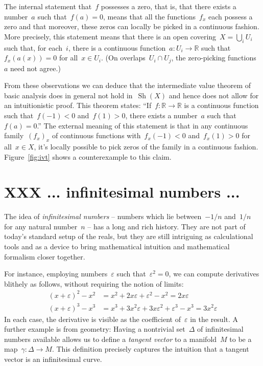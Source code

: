 \documentclass[oneside]{amsart}
\theoremstyle{definition}
\theoremstyle{plain}
\theoremstyle{remark}
\newcommand{\RR}{\mathbb{R}}
\DeclareMathOperator{\Sh}{Sh}
\renewcommand{\_}{\mathpunct{.}\,}
\newcommand{\?}{\,{:}\,}
\begin{document}
The internal statement that~$f$ possesses a zero, that is, that there exists a
number~$a$ such that~$f(a) = 0$, means that all the functions~$f_x$ each
possess a zero and that moreover, these zeros can locally be picked in a
continuous fashion. More precisely, this statement means that there is an open
covering~$X = \bigcup_i U_i$ such that, for each~$i$, there is a continuous
function~$a : U_i \to \RR$ such that~$f_x(a(x)) = 0$ for all~$x \in U_i$. (On
overlaps~$U_i \cap U_j$, the zero-picking functions~$a$ need not agree.)

From these observations we can deduce that the intermediate value theorem of
basic analysis does in general not hold in~$\Sh(X)$ and hence does not allow
for an intuitionistic proof. This theorem states: ``If~$f : \RR \to \RR$
is a continuous function such that~$f(-1) < 0$ and~$f(1) > 0$, there exists a
number~$a$ such that~$f(a) = 0$.'' The external meaning of this statement is
that in any continuous family~$(f_x)_x$ of continuous functions with~$f_x(-1) <
0$ and~$f_x(1) > 0$ for all~$x \in X$, it's locally possible to pick zeros of
the family in a continuous fashion. Figure~\ref{fig:ivt} shows a counterexample
to this claim.



\section{XXX ... infinitesimal numbers ...}

The idea of \emph{infinitesimal numbers} -- numbers which lie between~$-1/n$
and~$1/n$ for any natural number~$n$ -- has a long and rich history. They are
not part of today's standard setup of the reals, but they are still intriguing
as calculational tools and as a device to bring mathematical intuition and
mathematical formalism closer together.

For instance, employing numbers~$\varepsilon$ such that~$\varepsilon^2 = 0$, we can
compute derivatives blithely as follows, without requiring the notion of
limits:
\begin{align*}
  (x + \varepsilon)^2 - x^2 &= x^2 + 2x\varepsilon + \varepsilon^2 - x^2 = 2x\varepsilon \\
  (x + \varepsilon)^3 - x^3 &= x^3 + 3x^2\varepsilon + 3x\varepsilon^2 + \varepsilon^3 - x^3 = 3x^2\varepsilon
\end{align*}
In each case, the derivative is visible as the coefficient of~$\varepsilon$ in
the result. A further example is from geometry: Having a nontrivial
set~$\Delta$ of infinitesimal numbers available allows us to define a
\emph{tangent vector} to a manifold~$M$ to be a map~$\gamma : \Delta \to M$. This
definition precisely captures the intuition that a tangent vector is an
infinitesimal curve.
\end{document}
